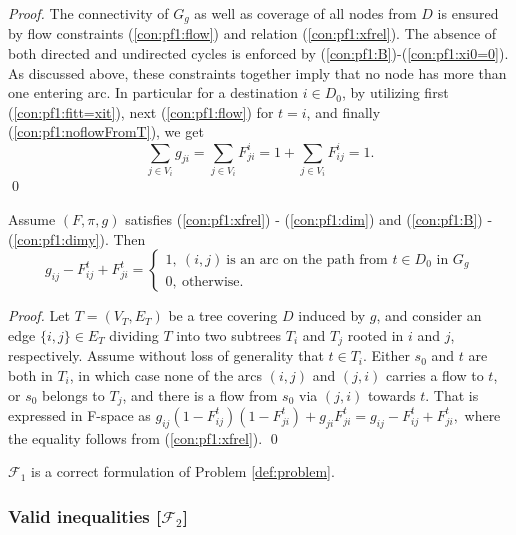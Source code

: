 \begin{proof}
The connectivity of $G_{g}$ as well as coverage of all nodes from $D$ is ensured by flow constraints (\ref{con:pf1:flow}) and relation (\ref{con:pf1:xfrel}).
The absence of both directed and undirected cycles is enforced by (\ref{con:pf1:B})-(\ref{con:pf1:xi0=0}).
As discussed above, these constraints together imply that no node has more than one entering arc.
In particular for a destination $i\in D_0$, by utilizing first (\ref{con:pf1:fitt=xit}), next (\ref{con:pf1:flow}) for $t=i$, and finally (\ref{con:pf1:noflowFromT}), we get
$$\sum_{j\in V_i}g_{ji}=\sum_{j\in V_i}F_{ji}^i = 1+\sum_{j\in V_i}F_{ij}^i=1.$$
\qed
\end{proof}


\begin{prop}\label{prop:transX}
Assume $(F,\pi,g)$ satisfies (\ref{con:pf1:xfrel}) - (\ref{con:pf1:dim}) and  (\ref{con:pf1:B}) - (\ref{con:pf1:dimy}). Then
$$
g_{ij} - F^t_{ij}+F^t_{ji} = 
	\begin{cases}
		1, ~(i,j)~\text{is an arc on the path from~$t\in D_0$ in $G_{g}$} \\
		0, ~\text{otherwise.}
	\end{cases}
$$
\end{prop}
%
\begin{proof}
Let $T=(V_T,E_T)$ be a tree covering $D$ induced by $g$, and consider an edge $\{i,j\}\in E_T$ dividing $T$ into two subtrees $T_i$ and $T_j$ rooted in $i$ and $j$, respectively.
Assume without loss of generality that $t\in T_i$.
Either $s_0$ and $t$ are both in $T_i$, in which case none of the arcs $(i,j)$ and $(j,i)$ carries a flow to $t$, or $s_0$ belongs to $T_j$, and there is a flow from $s_0$ via $(j,i)$ towards $t$.
That is expressed in F-space as
$
g_{ij}(1-F^{t}_{ij})(1-F^{t}_{ji})+g_{ji}F^{t}_{ji}=g_{ij} - F^t_{ij}+F^t_{ji},
$
where the equality follows from (\ref{con:pf1:xfrel}).
\qed
\end{proof}

\begin{cor}
$\mathcal{F}_1$ is a correct formulation of Problem \ref{def:problem}.
\end{cor}

\subsubsection{Valid inequalities [$\mathcal{F}_2$]}

